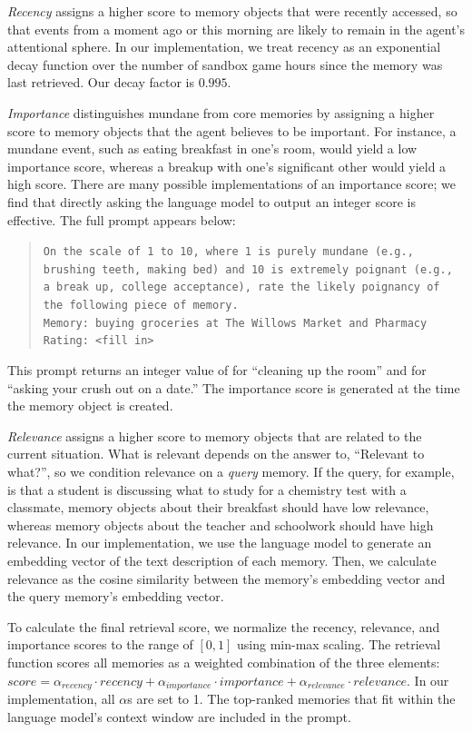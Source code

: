 \textit{Recency} assigns a higher score to memory objects that were recently accessed, so that events from a moment ago or this morning are likely to remain in the agent's attentional sphere. In our implementation, we treat recency as an exponential decay function over the number of sandbox game hours since the memory was last retrieved. Our decay factor is $0.995$. 

\textit{Importance} distinguishes mundane from core memories by assigning a higher score to memory objects that the agent believes to be important. For instance, a mundane event, such as eating breakfast in one's room, would yield a low importance score, whereas a breakup with one's significant other would yield a high score. There are many possible implementations of an importance score; we find that directly asking the language model to output an integer score is effective. The full prompt appears below:
    \begin{quote}
    {\small
    \texttt{On the scale of 1 to 10, where 1 is purely mundane (e.g., brushing teeth, making bed) and 10 is extremely poignant (e.g., a break up, college acceptance), rate the likely poignancy of the following piece of memory.\\
    Memory: buying groceries at The Willows Market and Pharmacy\\
    Rating: <fill in>}
    }
    \end{quote}
This prompt returns an integer value of  for “cleaning up the room” and  for “asking your crush out on a date.” The importance score is generated at the time the memory object is created.

\textit{Relevance} assigns a higher score to memory objects that are related to the current situation. What is relevant depends on the answer to, ``Relevant to what?'', so we condition relevance on a \textit{query} memory. If the query, for example, is that a student is discussing what to study for a chemistry test with a classmate, memory objects about their breakfast should have low relevance, whereas memory objects about the teacher and schoolwork should have high relevance. In our implementation, we use the language model to generate an embedding vector of the text description of each memory. Then, we calculate relevance as the cosine similarity between the memory's embedding vector and the query memory's embedding vector.

To calculate the final retrieval score, we normalize the recency, relevance, and importance scores to the range of $[0, 1]$ using min-max scaling. The retrieval function scores all memories as a weighted combination of the three elements: $score=\alpha_{recency} \cdot recency + \alpha_{importance} \cdot importance + \alpha_{relevance} \cdot relevance$. In our implementation, all $\alpha$s are set to 1. The top-ranked memories that fit within the language model's context window are included in the prompt.


